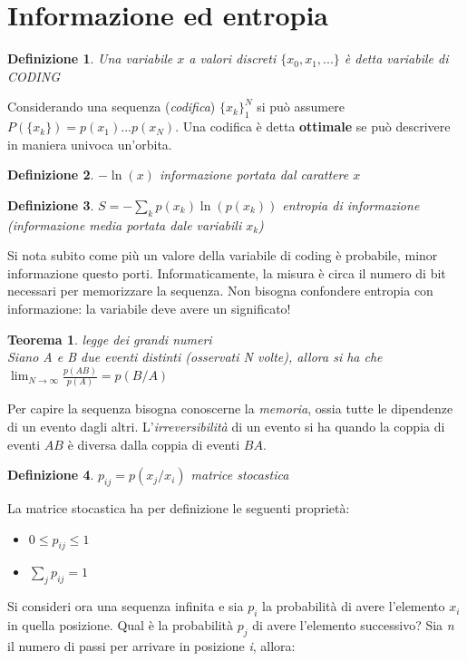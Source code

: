 \documentclass[12pt, a4paper]{article}
\theoremstyle{theorem}
\newtheorem{definition}{Definizione}[section]
\newtheorem{theorem}{Teorema}[section]
\begin{document}
	\section{Informazione ed entropia}
		\begin{definition}
			Una variabile $x$ a valori discreti $\{x_0,x_1,...\}$ è detta variabile di CODING
		\end{definition}
		Considerando una sequenza (\textit{codifica}) $\{x_k\}_1^N$ si può assumere $P(\{x_k\})=p(x_1)...p(x_N)$.
		Una codifica è detta \textbf{ottimale} se può descrivere in maniera univoca un'orbita.
		\begin{definition}
			$-\ln(x)$ informazione portata dal carattere $x$
		\end{definition}
		\begin{definition}
			$S=-\sum_kp(x_k)\ln(p(x_k))$ entropia di informazione (informazione media portata dale variabili $x_k$)
		\end{definition}
		Si nota subito come più un valore della variabile di coding è probabile, minor informazione questo porti.
		Informaticamente, la misura è circa il numero di bit necessari per memorizzare la sequenza.
		Non bisogna confondere entropia con informazione: la variabile deve avere un significato!
		\begin{theorem}
			legge dei grandi numeri\\
			Siano A e B due eventi distinti (osservati N volte), allora si ha che\\
			$\lim_{N\to\infty}\frac{p(AB)}{p(A)}=p(B/A)$
		\end{theorem}
		Per capire la sequenza bisogna conoscerne la \textit{memoria}, ossia tutte le dipendenze di un evento dagli altri.
		L'\textit{irreversibilità} di un evento si ha quando la coppia di eventi $AB$ è diversa dalla coppia di eventi $BA$.
		\begin{definition}
			$p_{ij}=p(x_j/x_i)$ matrice stocastica
		\end{definition}
		La matrice stocastica ha per definizione le seguenti proprietà:
		\begin{itemize}
			\item $0\leq p_{ij}\leq 1$
			\item $\sum_jp_{ij}=1$
		\end{itemize}
		Si consideri ora una sequenza infinita e sia $p_i$ la probabilità di avere l'elemento $x_i$ in quella posizione.
		Qual è la probabilità $p_j$ di avere l'elemento successivo?
		Sia \textit{n} il numero di passi per arrivare in posizione \textit{i}, allora:
\end{document}
